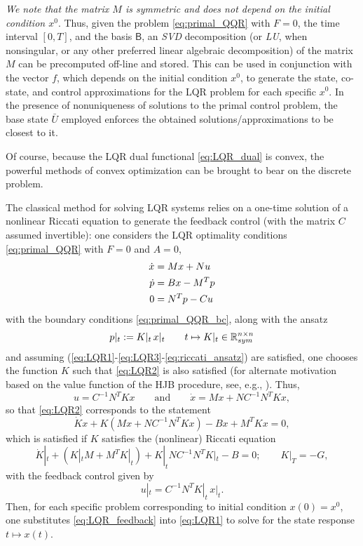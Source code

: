 \documentclass[11pt]{article}
\begin{document}
\emph{We note that the matrix $M$ is symmetric and does not depend on the initial condition $x^0$}. Thus, given the problem \eqref{eq:primal_QQR} with $F= 0$, the time interval $[0,T]$, and the basis $\mathsf{B}$, an \textit{SVD} decomposition (or \textit{LU}, when nonsingular, or any other preferred linear algebraic decomposition)  of the matrix $M$ can be precomputed off-line and stored. This can be used in conjunction with the vector $f$, which depends on the initial condition $x^0$, to generate the state, co-state, and control approximations for the LQR problem for each specific $x^0$. In the presence of nonuniqueness of solutions to the primal control problem, the base state $\bar{U}$ employed enforces the obtained solutions/approximations to be closest to it.

Of course, because the LQR dual functional \eqref{eq:LQR_dual} is convex, the powerful methods of convex optimization \cite{nesterov2018lectures} can be brought to bear on the discrete problem.

The classical method for solving LQR systems relies on a one-time solution of a nonlinear Riccati equation to generate the feedback control (with the matrix $C$ assumed invertible): one considers the LQR optimality conditions \eqref{eq:primal_QQR} with $F= 0$ and $A = 0$,
\begin{subequations}
    \allowdisplaybreaks
    \begin{align}
        \dot{x} & = Mx + Nu \label{eq:LQR1}\\
        \dot{p} & = Bx - M^Tp \label{eq:LQR2}\\
        0 & = N^Tp - Cu \label{eq:LQR3}
    \end{align}
\end{subequations}
with the boundary conditions \eqref{eq:primal_QQR_bc}, along with the ansatz
\begin{equation}\label{eq:riccati_ansatz}
p|_t := K|_t \, x|_t \qquad t \mapsto K|_t \in \mathbb R^{n \times n}_{sym}
\end{equation}
and assuming (\ref{eq:LQR1}-\ref{eq:LQR3}-\ref{eq:riccati_ansatz}) are satisfied, one chooses the function $K$ such that \eqref{eq:LQR2} is also satisfied (for alternate motivation based on the value function of the HJB procedure, see, e.g., \cite[Sec.~5.2.3]{evans1983introduction}). Thus,
\[
u = C^{-1}N^TKx \qquad \mbox{and} \qquad \dot{x} = Mx + NC^{-1}N^TKx,
\]
so that \eqref{eq:LQR2} corresponds to the statement
\[
\dot{K}x + K(Mx + NC^{-1}N^TKx) - Bx + M^TKx  = 0,
\]
which is satisfied if $K$ satisfies the (nonlinear) Riccati equation
\[
\dot{K}|_t + (K|_t M + M^T K|_t) + K|_t N C^{-1}N^TK|_t - B = 0; \qquad K|_T = - G,
\]
with the feedback control given by
\begin{equation}\label{eq:LQR_feedback}
u|_t = C^{-1}N^TK|_t \, x|_t.
\end{equation}
Then, for each specific problem corresponding to initial condition $x(0) = x^0$, one substitutes \eqref{eq:LQR_feedback} into \eqref{eq:LQR1} to solve for the state response $t \mapsto x(t)$.
\end{document}
